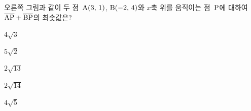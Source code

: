 \noindent\begin{minipage}[t]{0.58\linewidth}\vspace{0pt}\raggedright 오른쪽 그림과 같이 두 점~$\mathrm{A}(3,\mkern3mu 1)$, $\mathrm{B}(-2,\mkern3mu 4)$와 $x$축 위를 움직이는 점~$\mathrm{P}$에 대하여 $\overline{\mathrm{AP}}+\overline{\mathrm{BP}}$의 최솟값은?\end{minipage}\hfill\begin{minipage}[t]{0.4\linewidth}\vspace{0pt}\centering \resizebox{\ifdim\width>\linewidth\linewidth\else\width\fi}{!}{}\end{minipage}\par
\begin{choicesii}{\rule[-3ex]{0pt}{8ex}$4\sqrt{3}$}{\rule[-3ex]{0pt}{8ex}$5\sqrt{2}$}{\rule[-3ex]{0pt}{8ex}$2\sqrt{13}$}{\rule[-3ex]{0pt}{8ex}$2\sqrt{14}$}{\rule[-3ex]{0pt}{8ex}$4\sqrt{5}$}\end{choicesii}
